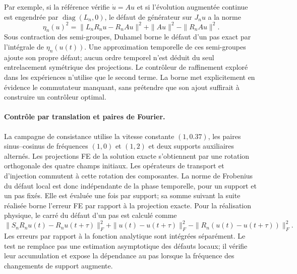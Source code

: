 \documentclass[11pt,a4paper]{article}
\begin{document}
Par exemple, si la référence vérifie $\dot u=Au$ et si l'évolution
augmentée continue est engendrée par $\operatorname{diag}(L_n,0)$,
le défaut de générateur sur $J_nu$ a la norme
\[
 \eta_n(u)^2=\|L_nR_nu-R_nAu\|^2
 +\|Au\|^2-\|R_nAu\|^2.
\]
Sous contraction des semi-groupes, Duhamel borne le défaut d'un pas
exact par l'intégrale de $\eta_n(u(t))$. Une approximation temporelle
de ces semi-groupes ajoute son propre défaut; aucun ordre temporel
n'est déduit du seul entrelacement symétrique des projections.
Le contrôleur de raffinement exploré dans les expériences n'utilise
que le second terme. La borne met explicitement en évidence le
commutateur manquant, sans prétendre que son ajout suffirait à construire
un contrôleur optimal.

\paragraph{Contrôle par translation et paires de Fourier.}
La campagne de consistance utilise la vitesse constante $(1,0.37)$,
les paires sinus--cosinus de fréquences $(1,0)$ et $(1,2)$ et deux
supports auxiliaires alternés. Les projections FE de la solution exacte
s'obtiennent par une rotation orthogonale des quatre champs initiaux.
Les opérateurs de transport et d'injection commutent à cette rotation
des composantes. La norme de Frobenius du défaut local est donc
indépendante de la phase temporelle, pour un support et un pas fixés.
Elle est évaluée une fois par support; sa somme suivant la suite réalisée
borne l'erreur FE par rapport à la projection exacte. Pour la réalisation
physique, le carré du défaut d'un pas est calculé comme
\[
 \|S_nR_nu(t)-R_nu(t+\tau)\|_F^2
 +\|u(t)-u(t+\tau)\|_F^2
 -\|R_n(u(t)-u(t+\tau))\|_F^2.
\]
Les erreurs par rapport à la fonction analytique sont intégrées
séparément. Le test ne remplace pas une estimation asymptotique des
défauts locaux; il vérifie leur accumulation et expose la dépendance
au pas lorsque la fréquence des changements de support augmente.
\end{document}
